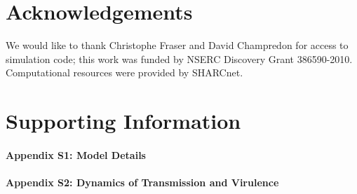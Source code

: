 \documentclass[10pt,letterpaper]{article}
\begin{document}
\section*{Acknowledgements}
We would like to thank Christophe Fraser and
David Champredon for access to simulation code;
this work was funded by NSERC Discovery Grant 386590-2010.
Computational resources were provided by SHARCnet.

\section*{Supporting Information}

\paragraph*{Appendix S1: Model Details}
\label{S1_Appendix}

\paragraph*{Appendix S2: Dynamics of Transmission and Virulence}

\label{S2_Appendix}

\clearpage

\nolinenumbers

%
%
% 
\end{document}
